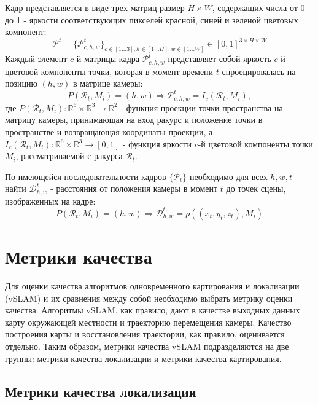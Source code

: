 \documentclass{mipt-thesis-ms}
\begin{document}
	Кадр представляется в виде трех матриц размер $H \times W$, содержащих числа от 0 до 1 - яркости соответствующих пикселей красной, синей и зеленой цветовых компонент:
	$$\mathcal{P}^t = \{\mathcal{P}^t_{c,h,w}\}_{c \in [1 \dots 3], h \in [1 \dots H], w \in [1 \dots W]} \in [0, 1]^{3 \times H \times W}$$
	Каждый элемент $c$-й матрицы кадра $\mathcal{P}^t_{c,h,w}$ представляет собой яркость $c$-й цветовой компоненты точки, которая в момент времени $t$ спроецировалась на позицию $(h, w)$ в матрице камеры:
	$$P(\mathcal{R}_t, M_i) = (h, w) \Rightarrow \mathcal{P}^t_{c,h,w} = I_c(\mathcal{R}_t, M_i),$$
	где $P(\mathcal{R}_t, M_i): \mathbb{R}^6 \times \mathbb{R}^3 \rightarrow \mathbb{R}^2$ - функция проекции точки пространства на матрицу камеры, принимающая на вход ракурс и положение точки в пространстве и возвращающая координаты проекции, а $I_c (\mathcal{R}_t, M_i): \mathbb{R}^6 \times \mathbb{R}^3 \rightarrow [0, 1]$ - функция яркости $c$-й цветовой компоненты точки $M_i$, рассматриваемой с ракурса $\mathcal{R}_t$.
	
	По имеющейся последовательности кадров $\{\mathcal{P}_t\}$ необходимо для всех $h,w,t$ найти $\mathcal{D}^t_{h,w}$ - расстояния от положения камеры в момент $t$ до точек сцены, изображенных на кадре:
	$$P(\mathcal{R}_t, M_i) = (h, w) \Rightarrow \mathcal{D}^t_{h,w} = \rho((x_t, y_t, z_t), M_i)$$
	
	
	\section{Метрики качества}
	
	Для оценки качества алгоритмов одновременного картирования и локализации (vSLAM) и их сравнения между собой необходимо выбрать метрику оценки качества. Алгоритмы vSLAM, как правило, дают в качестве выходных данных карту окружающей местности и траекторию перемещения камеры. Качество построения карты и восстановления траектории, как правило, оценивается отдельно. Таким образом, метрики качества vSLAM подразделяются на две группы: метрики качества локализации и метрики качества картирования.
	
	\subsection{Метрики качества локализации}
	
\end{document}
